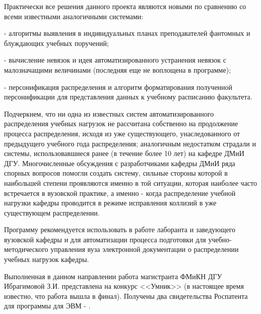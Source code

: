 Практически все решения данного проекта являются новыми по сравнению со всеми известными
аналогичными системами:

{}- алгоритмы выявления в индивидуальных планах преподавателей фантомных и блуждающих учебных поручений;

{}- вычисление невязок и идея автоматизированного устранения невязок с малозначащими величинами (последняя еще не
воплощена в программе);

{}- персонификация распределения и алгоритм форматирования полученной персонификации для представления данных к учебному
расписанию факультета.

Подчеркнем, что ни одна из известных систем автоматизированного распределения учебных нагрузок не рассчитана собственно
на продолжение процесса распределения, исходя из уже существующего, унаследованного от предыдущего учебного года
распределения; аналогичным недостатком страдали и системы, использовавшиеся ранее (в течение более 10 лет) на кафедре
ДМиИ ДГУ. Многочисленные обсуждения с разработчиками кафедры ДМиИ ряда спорных вопросов помогли создать систему,
сильные стороны которой в наибольшей степени проявляются именно в той ситуации, которая наиболее часто встречается в
вузовской практике, а именно - когда распределение учебной нагрузки кафедры проводится в режиме исправления коллизий в
уже существующем распределении.

Программу рекомендуется использовать в работе лаборанта и заведующего вузовской кафедры и для автоматизации процесса
подготовки для учебно-методического управления вуза электронной документации о распределении учебных нагрузок кафедры.

Выполненная в данном направлении работа магистранта ФМиКН ДГУ Ибрагимовой З.И. представлена на конкурс <<Умник>> (в
настоящее время известно, что работа вышла в финал). Получены два свидетельства Роспатента для программы для ЭВМ \cite{AKM_ch3_bib1} - \cite{AKM_ch3_bib2}.

















